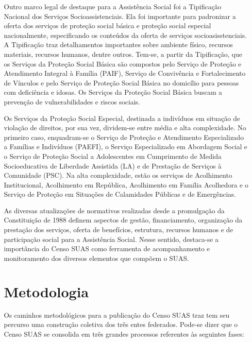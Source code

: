 \documentclass[
  brazilian]{report}
\begin{document}
Outro marco legal de destaque para a Assistência Social foi a
Tipificação Nacional dos Serviços Socioassistenciais. Ela foi importante
para padronizar a oferta dos serviços de proteção social básica e
proteção social especial nacionalmente, especificando os conteúdos da
oferta de serviços socioasisstenciais. A Tipificação traz detalhamentos
importantes sobre ambiente físico, recursos materiais, recursos humanos,
dentre outros. Tem-se, a partir da Tipificação, que os Serviços da
Proteção Social Básica são compostos pelo Serviço de Proteção e
Atendimento Integral à Família (PAIF), Serviço de Convivência e
Fortalecimento de Vínculos e pelo Serviço de Proteção Social Básica no
domicílio para pessoas com deficiência e idosas. Os Serviços da Proteção
Social Básica buscam a prevenção de vulnerabilidades e riscos sociais.

Os Serviços da Proteção Social Especial, destinada a indivíduos em
situação de violação de direitos, por sua vez, dividem-se entre média e
alta complexidade. No primeiro caso, enquadram-se o Serviço de Proteção
e Atendimento Especializado a Famílias e Indivíduos (PAEFI), o Serviço
Especializado em Abordagem Social e o Serviço de Proteção Social a
Adolescentes em Cumprimento de Medida Socioeducativa de Liberdade
Assistida (LA) e de Prestação de Serviços à Comunidade (PSC). Na alta
complexidade, estão os serviços de Acolhimento Institucional,
Acolhimento em República, Acolhimento em Família Acolhedora e o Serviço
de Proteção em Situações de Calamidades Públicas e de Emergências.

As diversas atualizações de normativos realizadas desde a promulgação da
Constituição de 1988 definem aspectos de gestão, financiamento,
organização da prestação dos serviços, oferta de benefícios, estrutura,
recursos humanos e de participação social para a Assistência Social.
Nesse sentido, destaca-se a importância do Censo SUAS como ferramenta de
acompanhamento e monitoramento dos diversos elementos que compõem o
SUAS.

\hypertarget{metodologia}{%
\chapter{Metodologia}\label{metodologia}}

Os caminhos metodológicos para a publicação do Censo SUAS traz tem seu
percurso uma construção coletiva dos três entes federados. Pode-se dizer
que o Censo SUAS se consolida em três grandes processos referentes às
seguintes fases:
\end{document}
